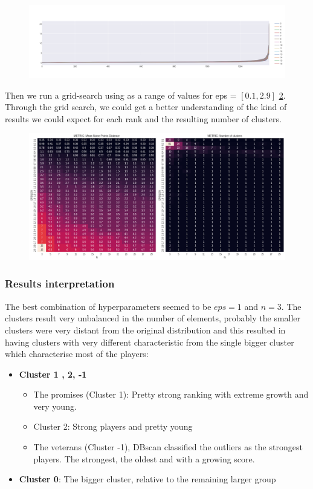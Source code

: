 \documentclass{article}
\begin{document}
\begin{figure}[h]
\centering
\includegraphics[width=\textwidth]{dbscan_distances}
\label{fig:dbscan_distances}
\end{figure}

Then we run a grid-search using as a range of values for eps = $[0.1, 2.9]$ \ref{fig:dbscan_metrics}. Through the grid search, we could get a better understanding of the kind of results we could expect for each rank and the resulting number of clusters.

\begin{figure}[h]
\centering
\includegraphics[width=.6\textwidth]{dbscan_metrics}
\label{fig:dbscan_metrics}
\end{figure}

\subsubsection{Results interpretation}
The best combination of hyperparameters seemed to be $eps=1$ and $n=3$. The clusters result very unbalanced in the number of elements, probably the smaller clusters were very distant from the original distribution and this resulted in having clusters with very different characteristic from the single bigger cluster which characterise most of the players:

\begin{itemize}
\item \textbf{Cluster 1 , 2, -1}
    \begin{itemize}
        \item The promises (Cluster 1): Pretty strong ranking with extreme growth and very young.
	    \item Cluster 2: Strong players and pretty young
	    \item The veterans (Cluster -1), DBscan classified the outliers as the strongest players. The strongest, the oldest and with a growing score.
	 \end{itemize}
\item \textbf{Cluster 0}: The bigger cluster, relative to the remaining larger group
\end{itemize}	
	
\end{document}
